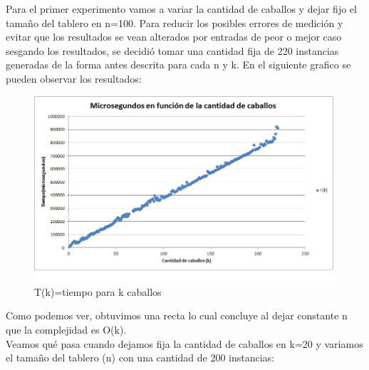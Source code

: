 Para el primer experimento vamos a variar la cantidad de caballos y dejar fijo el tamaño del tablero en n=100. Para reducir los posibles errores de medición y evitar que los resultados se vean alterados por entradas de peor o mejor caso sesgando los resultados, se decidió tomar una cantidad fija de 220 instancias generadas de la forma antes descrita para cada n y k. En el siguiente grafico se pueden observar los resultados:





\begin{figure}[H]
                \includegraphics[scale=1]{Imagenes/Ej2/nFijo}
                \caption{T(k)=tiempo para k caballos }
                \label{fig:exp1}
\end{figure} 

Como podemos ver, obtuvimos una recta lo cual concluye al dejar constante n que la complejidad es O(k).\\

Veamos qué pasa cuando dejamos fija la cantidad de caballos en k=20 y variamos el tamaño del tablero (n) con una cantidad de 200 instancias:

